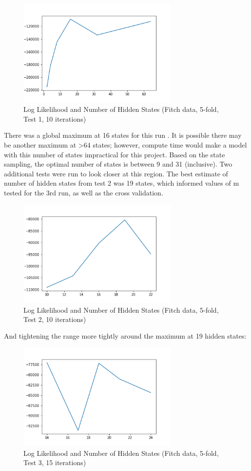 \documentclass[a4paper, 11pt]{article}
\begin{document}
\begin{figure}[!h]
	\caption{Log Likelihood and Number of Hidden States (Fitch data, 5-fold, Test 1, 10 iterations)}
	\includegraphics[width=8cm]{M_vs_Likelihood_Test_1.png}
\end{figure}

There was a global maximum at 16 states for this run . It is possible there may be another maximum at >64 states; however, compute time would make a model with this number of states impractical for this project. Based on the state sampling, the optimal number of states is between 9 and 31 (inclusive). Two additional tests were run to look closer at this region. The best estimate of number of hidden states from test 2 was 19 states, which informed values of m tested for the 3rd run, as well as the cross validation. \\
\begin{figure}[!h]
	\caption{Log Likelihood and Number of Hidden States (Fitch data, 5-fold, Test 2, 10 iterations)}
	\includegraphics[width=8cm]{M_vs_Likelihood_Test_2.png}
\end{figure}
And tightening the range more tightly around the maximum at 19 hidden states:
\begin{figure}[!h]
	\caption{Log Likelihood and Number of Hidden States (Fitch data, 5-fold, Test 3, 15 iterations)}
	\includegraphics[width=8cm]{M_vs_Likelihood_Test_3.png}
\end{figure}
\end{document}
